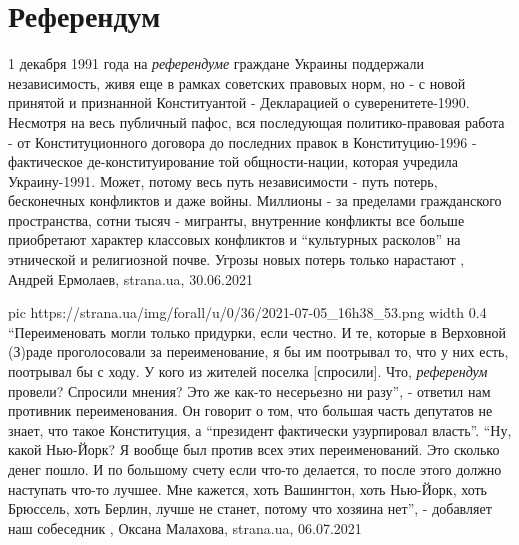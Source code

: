  
 
 
 
 
\chapter{Референдум}
\label{sec:slova.referendum}

1 декабря 1991 года на \emph{референдуме} граждане Украины поддержали независимость,
живя еще в рамках советских правовых норм, но - с новой принятой и признанной
Конституантой - Декларацией о суверенитете-1990.  Несмотря на весь публичный
пафос, вся последующая политико-правовая работа - от Конституционного договора
до последних правок в Конституцию-1996 - фактическое де-конституирование той
общности-нации, которая учредила Украину-1991. Может, потому весь путь
независимости - путь потерь, бесконечных конфликтов и даже войны. Миллионы - за
пределами гражданского пространства, сотни тысяч - мигранты, внутренние
конфликты все больше приобретают характер классовых конфликтов и \enquote{культурных
расколов} на этнической и религиозной почве. Угрозы новых потерь только
нарастают
, 
Андрей Ермолаев, strana.ua, 30.06.2021

\ifcmt
  pic https://strana.ua/img/forall/u/0/36/2021-07-05_16h38_53.png
	width 0.4
\fi
\enquote{Переименовать могли только придурки, если честно. И те, которые в Верховной
(З)раде проголосовали за переименование, я бы им поотрывал то, что у них есть,
поотрывал бы с ходу. У кого из жителей поселка [спросили]. Что, \emph{референдум}
провели? Спросили мнения?  Это же как-то несерьезно ни разу}, - ответил нам
противник переименования.  Он говорит о том, что большая часть депутатов не
знает, что такое Конституция, а \enquote{президент фактически узурпировал власть}.
\enquote{Ну, какой Нью-Йорк? Я вообще был против всех этих переименований. Это сколько
денег пошло. И по большому счету если что-то делается, то после этого должно
наступать что-то лучшее. Мне кажется, хоть Вашингтон, хоть Нью-Йорк, хоть
Брюссель, хоть Берлин, лучше не станет, потому что хозяина нет}, - добавляет
наш собеседник
, 
Оксана Малахова, strana.ua, 06.07.2021

